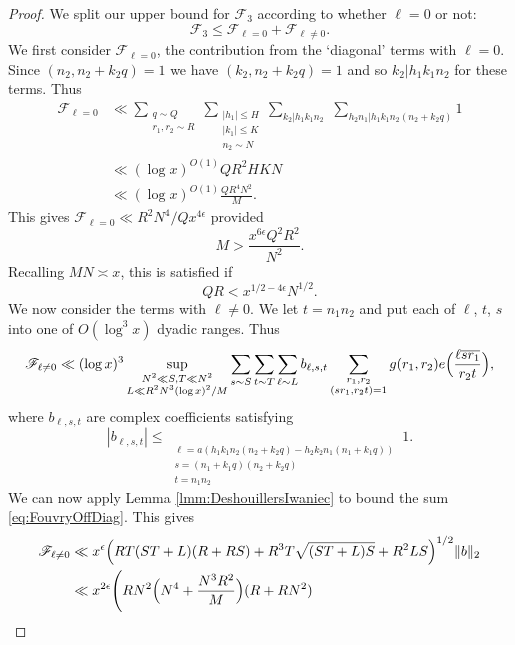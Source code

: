 \documentclass[10pt]{amsart}
\theoremstyle{plain}
\numberwithin{equation}{section}
\begin{document}
\begin{proof}
We split our upper bound for $\mathscr{F}_3$ according to whether $\ell=0$ or not:
\[
\mathscr{F}_3\le \mathscr{F}_{\ell=0}+\mathscr{F}_{\ell\ne 0}.
\]
We first consider $\mathscr{F}_{\ell=0}$, the contribution from the `diagonal' terms with $\ell=0$. Since $(n_2,n_2+k_2q)=1$ we have $(k_2,n_2+k_2q)=1$ and so $k_2|h_1k_1n_2$ for these terms. Thus
\begin{align*}
\mathscr{F}_{\ell=0}&\ll \sum_{\substack{q\sim Q\\ r_1,r_2\sim R}}\sum_{\substack{|h_1|\le H\\ |k_1|\le K\\ n_2\sim N}}\sum_{k_2|h_1k_1n_2}\,\,\sum_{h_2n_1|h_1k_1n_2(n_2+k_2q)}1\\
&\ll (\log{x})^{O(1)}Q R^2 H K N\\
&\ll (\log{x})^{O(1)} \frac{Q R^4 N^2 }{M}. 
\end{align*}
This gives $\mathscr{F}_{\ell=0}\ll R^2 N^4/Q x^{4\epsilon}$ provided
\[
M>\frac{x^{6\epsilon} Q^2 R^2}{N^2}.
\]
Recalling $MN\asymp x$, this is satisfied if
\begin{equation}
Q R<x^{1/2-4\epsilon} N^{1/2}.
\label{eq:FouvryCond2}
\end{equation}
We now consider the terms with $\ell\ne 0$. We let $t=n_1n_2$ and put each of $\ell$, $t$, $s$ into one of $O(\log^3{x})$ dyadic ranges. Thus 
\begin{equation}
\mathscr{F}_{\ell\ne 0} \ll (\log{x})^3\sup_{\substack{N^2\ll S,T\ll N^2 \\ L\ll R^2 N^3(\log{x})^2/M}}\sum_{s\sim S}\sum_{t\sim T}\sum_{\ell\sim L}b_{\ell,s,t}\sum_{\substack{r_1,r_2\\ (s r_1,r_2 t)=1}}g(r_1,r_2)e\Bigl(\frac{\ell \overline{s r_1}}{r_2 t}\Bigr),
\label{eq:FouvryOffDiag}
\end{equation}
where $b_{\ell,s,t}$ are complex coefficients satisfying
\[
|b_{\ell,s,t}|\le \mathop{\sum_{q\sim Q}\,\, \sum_{|k_1|,|k_2|\le K}\,\,\sum_{1\le |h_1|,|h_2|\le H'}\,\,\sum_{n_1,n_2\sim N}}\limits_{\substack{\ell=a(h_1k_1n_2(n_2+k_2q)-h_2k_2n_1(n_1+k_1q))\\
s=(n_1+k_1q)(n_2+k_2q)\\ t=n_1n_2}}1.
\]
We can now apply Lemma \ref{lmm:DeshouillersIwaniec} to bound the sum \eqref{eq:FouvryOffDiag}. This gives
\begin{align*}
\mathscr{F}_{\ell\ne 0}& \ll x^\epsilon\Bigl(RT(ST+L)(R+RS)+R^3T\sqrt{(ST+L)S}+R^2LS\Bigr)^{1/2}\|b\|_2\\
&\ll x^{2\epsilon}\Biggl(R N^2\Bigl(N^4+\frac{N^3 R^2}{M}\Bigr)(R+R N^2)\\

\end{align*}
\end{proof}
\end{document}
